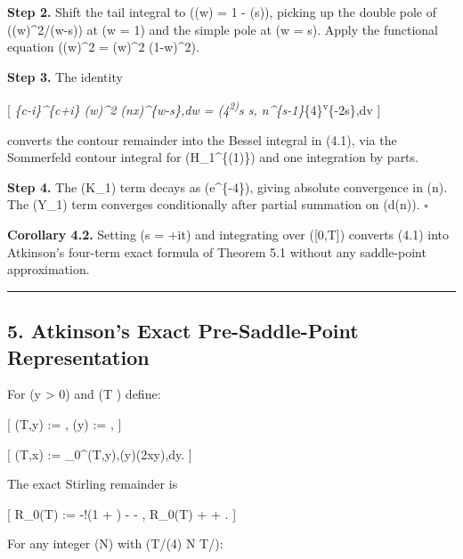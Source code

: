 \documentclass[
]{article}
\begin{document}
\textbf{Step 2.} Shift the tail integral to ((w) = 1 -
(s)), picking up the double pole of (\zeta(w)\^{}2/(w-s)) at
(w = 1) and the simple pole at (w = s). Apply the functional equation
(\zeta(w)\^{}2 = \chi(w)\^{}2 \zeta(1-w)\^{}2).

\textbf{Step 3.} The identity

{[} \int\emph{\{c-i\infty\}\^{}\{c+i\infty\}
\chi(w)\^{}2 (nx)\^{}\{w-s\},dw = (4\pi\textsuperscript{2)}s s,
n\^{}\{s-1\}\int}\{4\pi{}\}\textsuperscript{\infty {}v}\{-2s\},dv
{]}

converts the contour remainder into the Bessel integral in (4.1), via
the Sommerfeld contour integral for (H\_1\^{}\{(1)\}) and one
integration by parts.

\textbf{Step 4.} The (K\_1) term decays as (e\^{}\{-4\pi{}\}),
giving absolute convergence in (n). The (Y\_1) term converges
conditionally after partial summation on (d(n)). \(\square\)

\textbf{Corollary 4.2.} Setting (s = +it) and integrating
over ({[}0,T{]}) converts (4.1) into Atkinson's four-term exact formula
of Theorem 5.1 without any saddle-point approximation.

\begin{center}\rule{0.5\linewidth}{0.5pt}\end{center}

\subsection{5. Atkinson's Exact Pre-Saddle-Point
Representation}\label{atkinsons-exact-pre-saddle-point-representation}

For (y \textgreater{} 0) and (T ) define:

{[} \Phi(T,y) :=
,
\qquad \psi(y) := ,  {]}

{[} \Psi(T,x) := \int\_0\^{}\infty \Phi(T,y),\psi(y)\cos(2\pi xy),dy.
 {]}

The exact Stirling remainder is

{[} R\_0(T) := -\log!\left(1 + \right) -
 - , \qquad \textbar R\_0(T)\textbar{}
\le {} +  + .  {]}

For any integer (N) with (T/(4\pi) \le N \le T/\pi):
\end{document}
